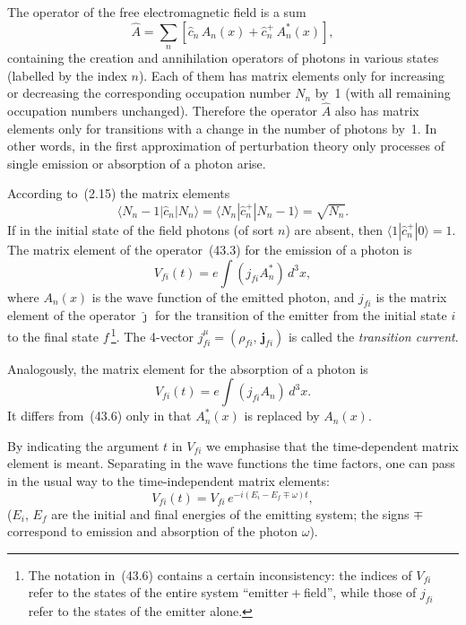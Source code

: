 The operator of the free electromagnetic field is a sum
\begin{equation}
\widehat A = \sum_n[\widehat c_n\,A_n(x) + \widehat c^+_n\,A^*_n(x)],
\tag{43.4}
\end{equation}
containing the creation and annihilation operators of photons in various states (labelled by the index $n$). Each of them has matrix elements only for increasing or decreasing the corresponding occupation number $N_n$ by~1 (with all remaining occupation numbers unchanged). Therefore the operator $\widehat A$ also has matrix elements only for transitions with a change in the number of photons by~1. In other words, in the first approximation of perturbation theory only processes of single emission or absorption of a photon arise.

According to~(2.15) the matrix elements
\begin{equation}
\langle N_n - 1|\widehat c_n|N_n\rangle = \langle N_n|\widehat c^+_n|N_n - 1\rangle = \sqrt{N_n}.
\tag{43.5}
\end{equation}
If in the initial state of the field photons (of sort $n$) are absent, then $\langle 1|\widehat c^+_n|0\rangle = 1$. The matrix element of the operator~(43.3) for the emission of a photon is
\begin{equation}
V_{fi}(t) = e\int(j_{fi}A^*_n)\,d^3x,
\tag{43.6}
\end{equation}
where $A_n(x)$ is the wave function of the emitted photon, and $j_{fi}$ is the matrix element of the operator $\widehat\jmath$ for the transition of the emitter from the initial state $i$ to the final state $f$\,\footnote{The notation in~(43.6) contains a certain inconsistency: the indices of $V_{fi}$ refer to the states of the entire system ``emitter${}+{}$field'', while those of $j_{fi}$ refer to the states of the emitter alone.}. The 4-vector $j^\mu_{fi} = (\rho_{fi},\,\mathbf{j}_{fi})$ is called the \textit{transition current}.

Analogously, the matrix element for the absorption of a photon is
\begin{equation}
V_{fi}(t) = e\int(j_{fi}A_n)\,d^3x.
\tag{43.7}
\end{equation}
It differs from~(43.6) only in that $A^*_n(x)$ is replaced by $A_n(x)$.

By indicating the argument $t$ in $V_{fi}$ we emphasise that the time-dependent matrix element is meant. Separating in the wave functions the time factors, one can pass in the usual way to the time-independent matrix elements:
\begin{equation}
V_{fi}(t) = V_{fi}\,e^{-i(E_i - E_f \mp \omega)t},
\tag{43.8}
\end{equation}
($E_i$, $E_f$ are the initial and final energies of the emitting system; the signs $\mp$ correspond to emission and absorption of the photon $\omega$).

